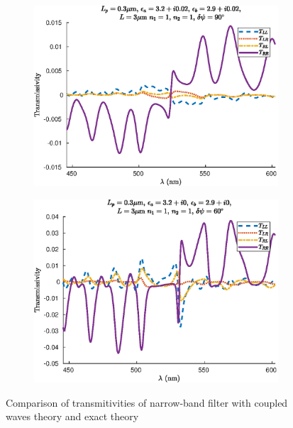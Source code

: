 \begin{figure}
\begin{subfigure}{0.49\linewidth}
		\includegraphics[width=\linewidth]{plots/defect/reflectivity_losses/comparison_transmission}
		\caption{}
	\end{subfigure}
	\begin{subfigure}{0.49\linewidth}
		\includegraphics[width=\linewidth]{plots/defect/reflectivity_other_defect/comparison_transmission}
		\caption{}
	\end{subfigure}
	\caption[Comparison of transmitivities of the narrow-band filter]{Comparison of transmitivities of narrow-band filter with coupled waves theory and exact theory}
	\label{fig:transmitivities_narrow_appendix_comp}
\end{figure}